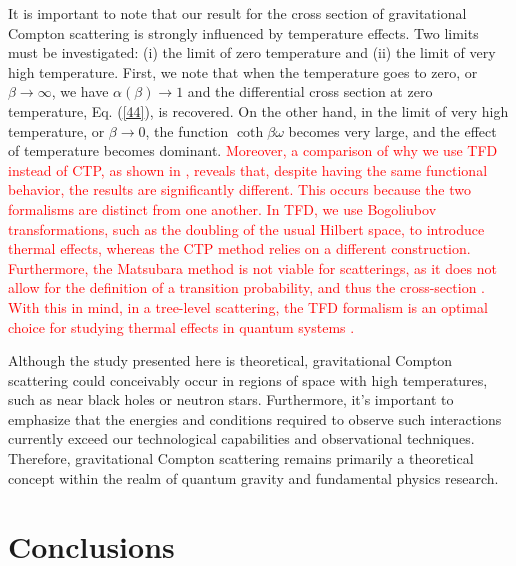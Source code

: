 \documentclass[11pt,showpacs,preprintnumbers,amsmath,amssymb,prd,nofootinbib,superscriptaddress]{revtex4-2}
\begin{document}
It is important to note that our result for the cross section of gravitational Compton scattering is strongly influenced by temperature effects. Two limits must be investigated: (i) the limit of zero temperature and (ii) the limit of very high temperature. First, we note that when the temperature goes to zero, or $\beta\rightarrow \infty$, we have
$\alpha(\beta)\rightarrow 1$
and the differential cross section at zero temperature, Eq. (\ref{44}), is recovered. On the other hand, in the limit of very high temperature, or  $\beta\rightarrow 0$, the function $\coth{\beta\omega}$ becomes very large, and the effect of temperature becomes dominant. \textcolor{red}{Moreover, a comparison of why we use TFD instead of CTP, as shown in \cite{cabral}, reveals that, despite having the same functional behavior, the results are significantly different. This occurs because the two formalisms are distinct from one another. In TFD, we use Bogoliubov transformations, such as the doubling of the usual Hilbert space, to introduce thermal effects, whereas the CTP method relies on a different construction. Furthermore, the Matsubara method is not viable for scatterings, as it does not allow for the definition of a transition probability, and thus the cross-section \cite{xu1995compton}. With this in mind, in a tree-level scattering, the TFD formalism is an optimal choice for studying thermal effects in quantum systems \cite{das2023finite}.}

Although the study presented here is theoretical, gravitational Compton scattering could conceivably occur in regions of space with high temperatures, such as near black holes or neutron stars. Furthermore, it's important to emphasize that the energies and conditions required to observe such interactions currently exceed our technological capabilities and observational techniques. Therefore, gravitational Compton scattering remains primarily a theoretical concept within the realm of quantum gravity and fundamental physics research.



\section{Conclusions}\label{V}
\end{document}
